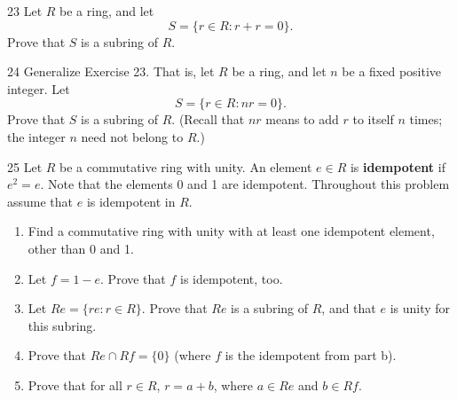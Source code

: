 \begin{problem}{23}
    Let $R$ be a ring, and let
    \[S = \{r \in R : r + r = 0\}.\]
    Prove that $S$ is a subring of $R$.
\end{problem}
\unsolved

\begin{problem}{24}
    Generalize Exercise 23. That is, let $R$ be a ring, and let $n$ be a fixed positive
    integer. Let
    \[S = \{r \in R : nr = 0\}.\]
    Prove that $S$ is a subring of $R$. (Recall that $nr$ means to add $r$ to itself $n$
    times; the integer $n$ need not belong to $R$.)
\end{problem}
\unsolved

\begin{problem}{25}
    Let $R$ be a commutative ring with unity. An element $e \in R$ is
    \textbf{idempotent} if $e^2 = e$. Note that the elements 0 and 1 are idempotent.
    Throughout this problem assume that $e$ is idempotent in $R$.
    \begin{enumerate}
        \item[(a)] Find a commutative ring with unity with at least one idempotent
        element, other than 0 and 1.
        \item[(b)] Let $f = 1 - e$. Prove that $f$ is idempotent, too.
        \item[(c)] Let $Re = \{re : r \in R\}$. Prove that $Re$ is a subring of $R$, and
        that $e$ is unity for this subring.
        \item[(d)] Prove that $Re \cap Rf = \{0\}$ (where $f$ is the idempotent from part b).
        \item[(e)] Prove that for all $r \in R$, $r = a + b$, where $a \in Re$ and $b \in Rf$.
    \end{enumerate}
\end{problem}
\unsolved
